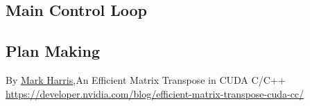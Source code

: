 \documentclass[conference]{IEEEtran}
\begin{document}
\subsection{Main Control Loop}
\subsection{Plan Making}





\begin{thebibliography}{00}
 By \href{https://developer.nvidia.com/blog/author/mharris/}{Mark Harris},An Efficient Matrix Transpose in CUDA C/C++ \href{}{https://developer.nvidia.com/blog/efficient-matrix-transpose-cuda-cc/}
\end{thebibliography}
\vspace{12pt}
\color{red}
\end{document}
